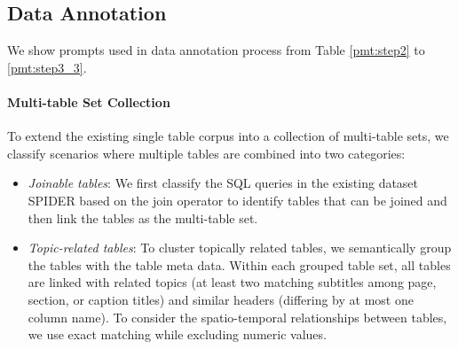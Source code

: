 \subsection{Data Annotation}
\label{apx:annotate_detail}
We show prompts used in data annotation process from Table \ref{pmt:step2} to \ref{pmt:step3_3}.
\paragraph{Multi-table Set Collection}
To extend the existing single table corpus into a collection of multi-table sets, we classify scenarios where multiple tables are combined into two categories: 
\begin{itemize}[leftmargin=*,topsep=4pt,itemsep=4pt,parsep=0pt]
\item\textit{Joinable tables}:
We first classify the SQL queries in the existing dataset SPIDER based on the join operator to identify tables that can be joined and then link the tables as the multi-table set. 

\item\textit{Topic-related tables}:
To cluster topically related tables, we semantically group the tables with the table meta data. Within each grouped table set, all tables are linked with related topics (at least two matching subtitles among page, section, or caption titles) and similar headers (differing by at most one column name). To consider the spatio-temporal relationships between tables, we use exact matching while excluding numeric values.
\end{itemize}

